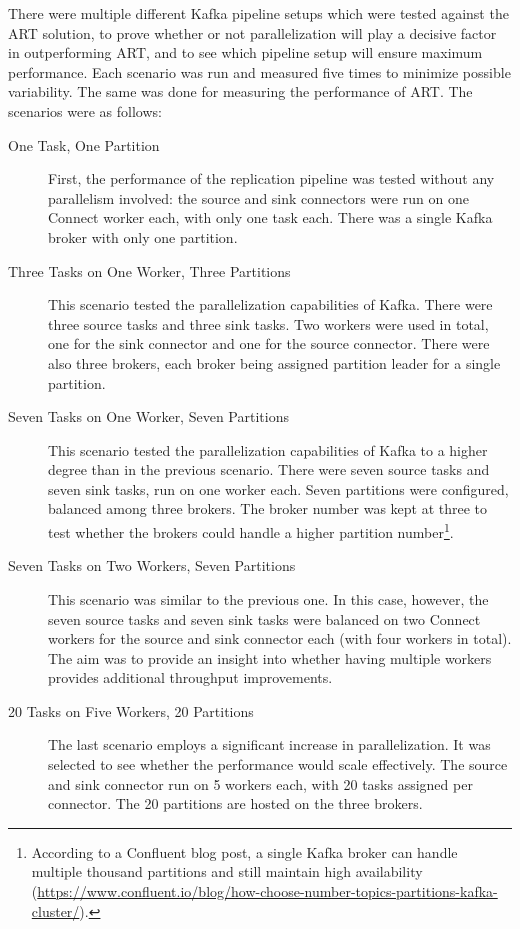 There were multiple different Kafka pipeline setups which were tested against the \ac{ART} solution, to prove whether or not parallelization will play a decisive factor in outperforming \ac{ART}, and to see which pipeline setup will ensure maximum performance. Each scenario was run and measured five times to minimize possible variability. The same was done for measuring the performance of \ac{ART}. The scenarios were as follows:
\begin{description}
    \item [One Task, One Partition]
    First, the performance of the replication pipeline was tested without any parallelism involved: the source and sink connectors were run on one Connect worker each, with only one task each. There was a single Kafka broker with only one partition.

    \item[Three Tasks on One Worker, Three Partitions]
    This scenario tested the parallelization capabilities of Kafka. There were three source tasks and three sink tasks. Two workers were used in total, one for the sink connector and one for the source connector. There were also three brokers, each broker being assigned partition leader for a single partition.

    \item[Seven Tasks on One Worker, Seven Partitions]
    This scenario tested the parallelization capabilities of Kafka to a higher degree than in the previous scenario. There were seven source tasks and seven sink tasks, run on one worker each. Seven partitions were configured, balanced among three brokers. The broker number was kept at three to test whether the brokers could handle a higher partition number\footnote{According to a Confluent blog post, a single Kafka broker can handle multiple thousand partitions and still maintain high availability (\url{https://www.confluent.io/blog/how-choose-number-topics-partitions-kafka-cluster/}).}.

    \item[Seven Tasks on Two Workers, Seven Partitions]
    This scenario was similar to the previous one. In this case, however, the seven source tasks and seven sink tasks were balanced on two Connect workers for the source and sink connector each (with four workers in total). The aim was to provide an insight into whether having multiple workers provides additional throughput improvements.
    
    \item[20 Tasks on Five Workers, 20 Partitions] The last scenario employs a significant increase in parallelization. It was selected to see whether the performance would scale effectively. The source and sink connector run on 5 workers each, with 20 tasks assigned per connector. The 20 partitions are hosted on the three brokers.
    
\end{description}

